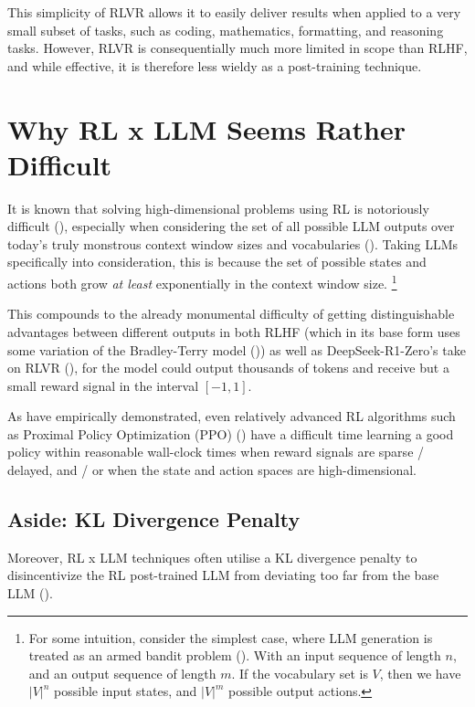 \documentclass{article} %
\theoremstyle{definition}
\begin{document}
This simplicity of RLVR allows it to easily deliver results when applied to 
a very small subset of tasks, such as coding, mathematics, formatting, and reasoning tasks.
However, RLVR is consequentially much more limited in scope than RLHF,
and while effective, it is therefore less wieldy as a post-training technique.

\section{Why RL x LLM Seems Rather Difficult}

It is known that solving high-dimensional problems using RL is notoriously difficult 
(\cite{Sutton-and-Barto-1998, Jones-2021}),
especially when considering the set of all possible LLM outputs over today's
truly monstrous context window sizes and vocabularies (\cite{Anthropic-2025, DeepSeek-2025, Google-2025}).
Taking LLMs specifically into consideration,
this is because the set of possible states and actions both grow \textit{at least} exponentially
in the context window size. \footnote{
    For some intuition, consider the simplest case, where
    LLM generation is treated as an armed bandit problem (\cite{Sutton-and-Barto-1998}).
    With an input sequence of length $n$,
    and an output sequence of length $m$.
    If the vocabulary set is $V$,
    then we have $|V|^n$ possible input states,
    and $|V|^m$ possible output actions.
}

This compounds to the already monumental difficulty of getting 
distinguishable advantages between different outputs
in both RLHF (which in its base form uses some variation of the Bradley-Terry model (\cite{Bradley-and-Terry-1952}))
as well as DeepSeek-R1-Zero's take on RLVR (\cite{DeepSeek-2025}), 
for the model could output thousands of tokens and receive but a small reward signal
in the interval $[-1, 1]$. 

As \cite{Salimans-and-Chen-2018} have empirically demonstrated,
even relatively advanced RL algorithms such as Proximal Policy Optimization (PPO) 
(\cite{Schulman-et-al-2017}) have a difficult time learning a good policy
within reasonable wall-clock times
when reward signals are sparse / delayed, and / or when 
the state and action spaces are high-dimensional.

\subsection{Aside: KL Divergence Penalty}
Moreover, RL x LLM techniques often utilise a KL divergence penalty
to disincentivize the RL post-trained LLM from deviating too far from the base LLM
(\cite{InstructGPT-2022, Lambert-et-al-2024, DeepSeek-2025}).
\end{document}
